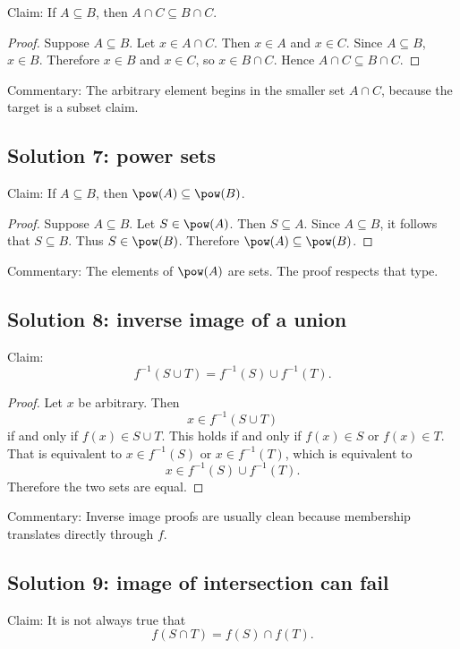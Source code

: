 Claim: If $A\subseteq B$, then $A\cap C\subseteq B\cap C$.

\begin{proof}
Suppose $A\subseteq B$. Let $x\in A\cap C$. Then $x\in A$ and $x\in C$. Since $A\subseteq B$, $x\in B$. Therefore $x\in B$ and $x\in C$, so $x\in B\cap C$. Hence $A\cap C\subseteq B\cap C$.
\end{proof}

Commentary: The arbitrary element begins in the smaller set $A\cap C$, because the target is a subset claim.

\subsection{Solution 7: power sets}

Claim: If $A\subseteq B$, then $\pow(A)\subseteq\pow(B)$.

\begin{proof}
Suppose $A\subseteq B$. Let $S\in\pow(A)$. Then $S\subseteq A$. Since $A\subseteq B$, it follows that $S\subseteq B$. Thus $S\in\pow(B)$. Therefore $\pow(A)\subseteq\pow(B)$.
\end{proof}

Commentary: The elements of $\pow(A)$ are sets. The proof respects that type.

\subsection{Solution 8: inverse image of a union}

Claim:
\[
f^{-1}(S\cup T)=f^{-1}(S)\cup f^{-1}(T).
\]

\begin{proof}
Let $x$ be arbitrary. Then
\[
x\in f^{-1}(S\cup T)
\]
if and only if $f(x)\in S\cup T$. This holds if and only if $f(x)\in S$ or $f(x)\in T$. That is equivalent to $x\in f^{-1}(S)$ or $x\in f^{-1}(T)$, which is equivalent to
\[
x\in f^{-1}(S)\cup f^{-1}(T).
\]
Therefore the two sets are equal.
\end{proof}

Commentary: Inverse image proofs are usually clean because membership translates directly through $f$.

\subsection{Solution 9: image of intersection can fail}

Claim: It is not always true that
\[
f(S\cap T)=f(S)\cap f(T).
\]

